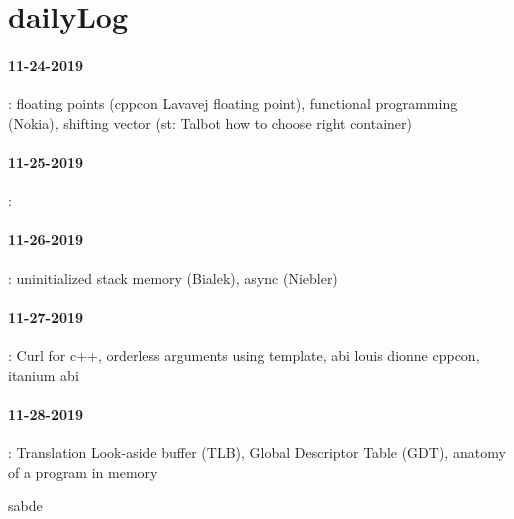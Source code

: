 \section{dailyLog}
\paragraph{11-24-2019}: floating points (cppcon Lavavej floating point), functional programming (Nokia), shifting vector (st: Talbot how to choose right container)
\paragraph{11-25-2019}:
\paragraph{11-26-2019}: uninitialized stack memory (Bialek), async (Niebler) 
\paragraph{11-27-2019}: Curl for c++, orderless arguments using template, abi louis dionne cppcon, itanium abi
\paragraph{11-28-2019}: Translation Look-aside buffer (TLB), Global Descriptor Table (GDT), anatomy of a program in memory 


sabde
